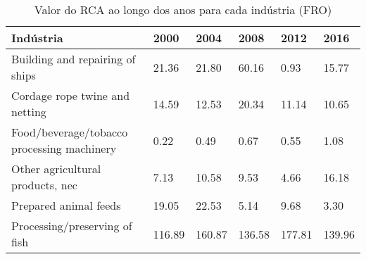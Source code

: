 \begin{table}
\centering
\caption{Valor do RCA ao longo dos anos para cada indústria (FRO)}
\label{tab:ex3-tempo-FRO}
\begin{tabular}{p{6cm}p{1.5cm}p{1.5cm}p{1.5cm}p{1.5cm}p{1.5cm}}
\toprule
                                 Indústria &   2000 &   2004 &   2008 &   2012 &   2016 \\
\midrule
           Building and repairing of ships &  21.36 &  21.80 &  60.16 &   0.93 &  15.77 \\
            Cordage rope twine and netting &  14.59 &  12.53 &  20.34 &  11.14 &  10.65 \\
Food/beverage/tobacco processing machinery &   0.22 &   0.49 &   0.67 &   0.55 &   1.08 \\
          Other agricultural products, nec &   7.13 &  10.58 &   9.53 &   4.66 &  16.18 \\
                     Prepared animal feeds &  19.05 &  22.53 &   5.14 &   9.68 &   3.30 \\
             Processing/preserving of fish & 116.89 & 160.87 & 136.58 & 177.81 & 139.96 \\
\bottomrule
\end{tabular}
\end{table}
